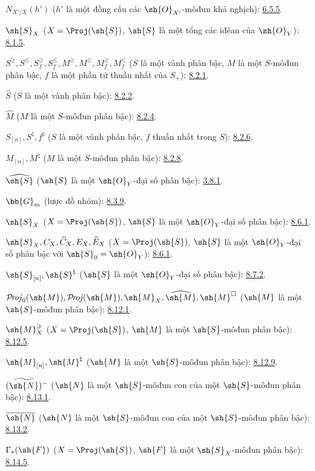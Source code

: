 \documentclass[oneside,10pt]{amsart}
\renewcommand{\leq}{\leqslant}
\renewcommand{\geq}{\geqslant}
\def\shProj{\mathcal{P}\!\mathit{roj}}
\begin{document}
$N_{X'/X}(h')$
($h'$ là một đồng cấu các $\sh{O}_{X'}$-môđun khả nghịch): \hyperref[II.6.5.5]{6.5.5}.

$\sh{S}_X$ ($X=\Proj(\sh{S})$, $\sh{S}$ là một tổng các iđêan của
$\sh{O}_Y$): \hyperref[II.8.1.5]{8.1.5}.

$S^\geq,S^\leq,S_f^\geq,S_f^\leq,
M^\geq,M^\leq,M_f^\geq,M_f^\leq$
($S$ là một vành phân bậc, $M$ là một $S$-môđun phân bậc,
$f$ là một phần tử thuần nhất của $S_+$): \hyperref[II.8.2.1]{8.2.1}.

$\widehat S$ ($S$ là một vành phân bậc): \hyperref[II.8.2.2]{8.2.2}.

$\widehat M$ ($M$ là một $S$-môđun phân bậc): \hyperref[II.8.2.4]{8.2.4}.

$S_{[n]},S^\natural,f^\natural$
($S$ là một vành phân bậc, $f$ thuần nhất trong $S$): \hyperref[II.8.2.6]{8.2.6}.

$M_{[n]},M^\natural$ ($M$ là một $S$-môđun phân bậc): \hyperref[II.8.2.8]{8.2.8}.

$\widehat{\sh{S}}$ ($\sh{S}$ là một $\sh{O}_Y$-đại số phân bậc): \hyperref[II.8.3.1]{3.8.1}.

$\bb{G}_m$ (lược đồ nhóm): \hyperref[II.8.3.9]{8.3.9}.

$\sh{S}_X$ ($X=\Proj(\sh{S})$, $\sh{S}$ là một $\sh{O}_Y$-đại số phân bậc): \hyperref[II.8.6.1]{8.6.1}.

$\sh{S}_X,C_X,\widehat C_X,E_X,\widehat E_X$
($X=\Proj(\sh{S})$, $\sh{S}$ là một $\sh{O}_Y$-đại số phân bậc
với $\sh{S}_0=\sh{O}_Y$): \hyperref[II.8.6.1]{8.6.1}.

$\sh{S}_{[n]},\sh{S}^{\natural}$
($\sh{S}$ là một $\sh{O}_Y$-đại số phân bậc): \hyperref[II.8.7.2]{8.7.2}.

$\shProj_0(\sh{M}),\shProj(\sh{M}),\sh{M}_X,
\widehat{\sh{M}},\sh{M}^{\square}$
($\sh{M}$ là một $\sh{S}$-môđun phân bậc): \hyperref[II.8.12.1]{8.12.1}.

$\sh{M}_X^\geq$
($X=\Proj(\sh{S})$, $\sh{M}$ là một $\sh{S}$-môđun phân bậc): \hyperref[II.8.12.5]{8.12.5}.

$\sh{M}_{[n]},\sh{M}^{\natural}$
($\sh{M}$ là một $\sh{S}$-môđun phân bậc): \hyperref[II.8.12.9]{8.12.9}.

$(\widetilde{\sh{N}})^-$
($\sh{N}$ là một $\sh{S}$-môđun con của một $\sh{S}$-môđun phân bậc): \hyperref[II.8.13.1]{8.13.1}.

$\overline{\sh{N}}$
($\sh{N}$ là một $\sh{S}$-môđun con của một $\sh{S}$-môđun phân bậc): \hyperref[II.8.13.2]{8.13.2}.

$\Gamma_*(\sh{F})$
($X=\Proj(\sh{S})$, $\sh{F}$ là một $\sh{S}_X$-môđun phân bậc): \hyperref[II.8.14.5]{8.14.5}.
\end{document}
